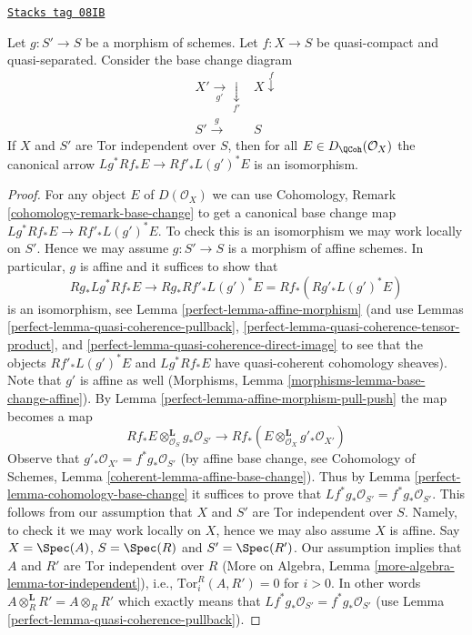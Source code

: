 \begin{lemma}
\label{perfect-lemma-compare-base-change}
\href{https://stacks.math.columbia.edu/tag/08IB}{\texttt{Stacks tag 08IB}}

Let $g : S' \to S$ be a morphism of schemes.
Let $f : X \to S$ be quasi-compact and quasi-separated.
Consider the base change diagram
$$
\begin{array}{cc}X' \underset{g'}{\longrightarrow}\underset{f'}{\downarrow} & X \overset{f}{\downarrow} \\ S' \overset{g}{\longrightarrow} & S\end{array}
$$
If $X$ and $S'$ are Tor independent over $S$, then for all
$E \in D_\QCoh(\mathcal{O}_X)$ the canonical arrow
$Lg^*Rf_*E \to Rf'_*L(g')^*E$ is an isomorphism.
\end{lemma}

\begin{proof}

For any object $E$ of $D(\mathcal{O}_X)$ we can use
Cohomology, Remark \ref{cohomology-remark-base-change} to get a
canonical base change map $Lg^*Rf_*E \to Rf'_*L(g')^*E$. To check this
is an isomorphism we may work locally on $S'$. Hence we may assume
$g : S' \to S$ is a morphism of affine schemes. In particular, $g$
is affine and it suffices to show that
$$
Rg_*Lg^*Rf_*E \to Rg_*Rf'_*L(g')^*E = Rf_*(Rg'_* L(g')^* E)
$$
is an isomorphism, see Lemma \ref{perfect-lemma-affine-morphism}
(and use Lemmas \ref{perfect-lemma-quasi-coherence-pullback},
\ref{perfect-lemma-quasi-coherence-tensor-product}, and
\ref{perfect-lemma-quasi-coherence-direct-image}
to see that the objects $Rf'_*L(g')^*E$ and $Lg^*Rf_*E$
have quasi-coherent cohomology sheaves). Note that $g'$ is
affine as well (Morphisms, Lemma \ref{morphisms-lemma-base-change-affine}).
By Lemma \ref{perfect-lemma-affine-morphism-pull-push} the map becomes a map
$$
Rf_*E \otimes_{\mathcal{O}_S}^\mathbf{L} g_*\mathcal{O}_{S'}
\longrightarrow
Rf_*(E \otimes_{\mathcal{O}_X}^\mathbf{L} g'_*\mathcal{O}_{X'})
$$
Observe that $g'_*\mathcal{O}_{X'} = f^*g_*\mathcal{O}_{S'}$ (by affine
base change, see Cohomology of Schemes, Lemma
\ref{coherent-lemma-affine-base-change}).
Thus by
Lemma \ref{perfect-lemma-cohomology-base-change} it suffices to prove that
$Lf^*g_*\mathcal{O}_{S'} = f^*g_*\mathcal{O}_{S'}$. This follows from our
assumption that $X$ and $S'$ are Tor independent over $S$. Namely, to
check it we may work locally on $X$, hence we may also assume $X$ is affine.
Say $X = \Spec(A)$, $S = \Spec(R)$ and $S' = \Spec(R')$. Our assumption
implies that $A$ and $R'$ are Tor independent over $R$
(More on Algebra, Lemma \ref{more-algebra-lemma-tor-independent}), i.e.,
$\text{Tor}_i^R(A, R') = 0$ for $i > 0$. In other words
$A \otimes_R^\mathbf{L} R' = A \otimes_R R'$ which exactly means
that $Lf^*g_*\mathcal{O}_{S'} = f^*g_*\mathcal{O}_{S'}$
(use Lemma \ref{perfect-lemma-quasi-coherence-pullback}).
\end{proof}

